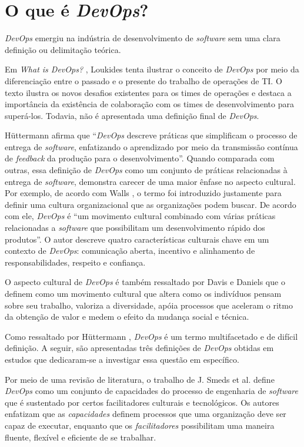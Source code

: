 \section{O que é \textit{DevOps}?}

\textit{DevOps} emergiu na indústria de desenvolvimento de \textit{software}
sem uma clara definição ou delimitação teórica.

Em \textit{What is DevOps?} \cite{what_is_devops}, Loukides tenta ilustrar o
conceito de \textit{DevOps} por meio da diferenciação entre o passado e o
presente do trabalho de operações de \acrshort{TI}. O texto ilustra os novos
desafios existentes para os times de operações e destaca a importância da
existência de colaboração com os times de desenvolvimento para superá-los.
Todavia, não é apresentada uma definição final de \textit{DevOps}.

H\"uttermann afirma que ``\textit{DevOps} descreve práticas que simplificam o
processo de entrega de \textit{software}, enfatizando o aprendizado por meio da
transmissão contínua de \textit{feedback} da produção para o desenvolvimento''.
Quando comparada com outras, essa definição de \textit{DevOps} como um conjunto
de práticas relacionadas à entrega de \textit{software}, demonstra carecer
de uma maior ênfase no aspecto cultural. Por exemplo, de acordo com
Walls \cite{building_devops_culture}, o termo foi introduzido justamente para
definir uma cultura organizacional que as organizações podem buscar. De acordo
com ele, \textit{DevOps} é ``um movimento cultural combinado com várias
práticas relacionadas a \textit{software} que possibilitam um desenvolvimento
rápido dos produtos''. O autor descreve quatro características culturais chave em um
contexto de \textit{DevOps}: comunicação aberta, incentivo e alinhamento de
responsabilidades, respeito e confiança.

O aspecto cultural de \textit{DevOps} é também ressaltado por Davis e Daniels
\cite{effective_devops} que o definem como um movimento cultural que altera
como os indivíduos pensam sobre seu trabalho, valoriza a diversidade, apóia
processos que aceleram o ritmo da obtenção de valor e medem o efeito da mudança
social e técnica.

Como ressaltado por H\"uttermann \cite{devops_for_developers}, \textit{DevOps}
é um termo multifacetado e de difícil definição. A seguir, são apresentadas
três definições de \textit{DevOps} obtidas em estudos que dedicaram-se a
investigar essa questão em específico.

Por meio de uma revisão de literatura, o trabalho de J. Smeds et al.
\cite{devops_a_definition} define \textit{DevOps} como um conjunto de
capacidades do processo de engenharia de \textit{software} que é sustentado
por certos facilitadores culturais e tecnológicos. Os autores enfatizam
que as \emph{capacidades} definem processos que uma organização deve ser capaz
de executar, enquanto que os \emph{facilitadores} possibilitam uma maneira
fluente, flexível e eficiente de se trabalhar.

